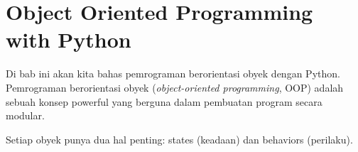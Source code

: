 
\chapter{Object Oriented Programming with Python}

Di bab ini akan kita bahas pemrograman berorientasi obyek dengan Python. Pemrograman berorientasi obyek (\emph{object-oriented programming}, OOP) adalah sebuah konsep powerful yang berguna dalam pembuatan program secara modular.

Setiap obyek punya dua hal penting: states (keadaan) dan behaviors (perilaku).


